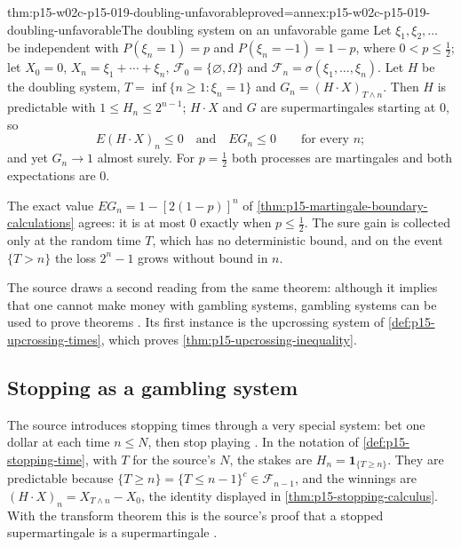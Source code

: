 \begin{hbcorollary}{thm:p15-w02c-p15-019-doubling-unfavorable}{proved=annex:p15-w02c-p15-019-doubling-unfavorable}{The doubling system on an unfavorable game}
Let \(\xi_1,\xi_2,\ldots\) be independent with
\(P(\xi_n=1)=p\) and \(P(\xi_n=-1)=1-p\), where \(0<p\leq\tfrac12\);
let \(X_0=0\), \(X_n=\xi_1+\cdots+\xi_n\),
\(\mathcal F_0=\{\varnothing,\Omega\}\) and
\(\mathcal F_n=\sigma(\xi_1,\ldots,\xi_n)\). Let \(H\) be the doubling
system, \(T=\inf\{n\geq1:\xi_n=1\}\) and \(G_n=(H\cdot X)_{T\wedge n}\).
Then \(H\) is predictable with \(1\leq H_n\leq2^{n-1}\); \(H\cdot X\) and
\(G\) are supermartingales starting at \(0\), so
\[
          E(H\cdot X)_n\leq0\quad\text{and}\quad EG_n\leq0
          \qquad\text{for every }n;
\]
and yet \(G_n\to1\) almost surely. For \(p=\tfrac12\) both processes are
martingales and both expectations are \(0\).
\end{hbcorollary}

The exact value \(EG_n=1-[2(1-p)]^n\) of
\cref{thm:p15-martingale-boundary-calculations} agrees: it is at most
\(0\) exactly when \(p\leq\tfrac12\). The sure gain is collected only at
the random time \(T\), which has no deterministic bound, and on the
event \(\{T>n\}\) the loss \(2^n-1\) grows without bound in \(n\).

The source draws a second reading from the same theorem: although it
implies that one cannot make money with gambling systems, gambling
systems can be used to prove theorems \cite[p.~220]{DurrettPTEAuthor2019}.
Its first instance is the upcrossing system of
\cref{def:p15-upcrossing-times}, which proves
\cref{thm:p15-upcrossing-inequality}.

\subsection*{Stopping as a gambling system}

The source introduces stopping times through a very special system:
bet one dollar at each time \(n\leq N\), then stop playing
\cite[p.~220]{DurrettPTEAuthor2019}. In the notation of
\cref{def:p15-stopping-time}, with \(T\) for the source's \(N\), the
stakes are \(H_n=\mathbf1_{\{T\geq n\}}\). They are predictable because
\(\{T\geq n\}=\{T\leq n-1\}^c\in\mathcal F_{n-1}\), and the winnings are
\((H\cdot X)_n=X_{T\wedge n}-X_0\), the identity displayed in
\cref{thm:p15-stopping-calculus}. With the transform theorem this is the
source's proof that a stopped supermartingale is a supermartingale
\cite[thm.~4.2.9, p.~220]{DurrettPTEAuthor2019}.

